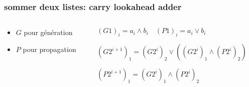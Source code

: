 \documentclass[11pt,xcolor={usenames,dvipsnames}]{beamer}
\begin{document}
\begin{frame} 
\frametitle{sommer deux listes: carry lookahead adder}
  \begin{figure}
    \begin{center}
      \begin{tikzpicture}[scale = 0.5, transform shape]
      	
      \end{tikzpicture}
    \end{center}
  \end{figure}


\begin{columns}
\begin{column}{0.4\textwidth}
\pause
\begin{itemize}
\item $G$ pour génération
  \begin{figure}
    \begin{center}
      \begin{tikzpicture}[scale = 0.6, transform shape]
      	
      \end{tikzpicture}
    \end{center}
  \end{figure}
\item $P$ pour propagation
  \begin{figure}
    \begin{center}
      \begin{tikzpicture}[scale = 0.6, transform shape]
      	
      \end{tikzpicture}
    \end{center}
  \end{figure}
\end{itemize}
\end{column}

\begin{column}{0.6\textwidth}  %
\pause


$(G1)_i = a_i \wedge b_i \quad (P1)_i = a_i \vee b_i$
\pause

  \begin{figure}
    \begin{center}
      \begin{tikzpicture}[scale = 0.9, transform shape]
      	
      \end{tikzpicture}
    \end{center}
  \end{figure}

${(G2^{i+1})}_1 = {(G2^i)}_2 \vee \left ( {(G2^i)}_1 \wedge {(P2^i)}_2 \right)$\\

\vspace{0.3cm}

${(P2^{i+1})}_1 = {(G2^i)}_1 \wedge {(P2^i)}_2$

\end{column}
\end{columns}

\end{frame} 
\end{document}
